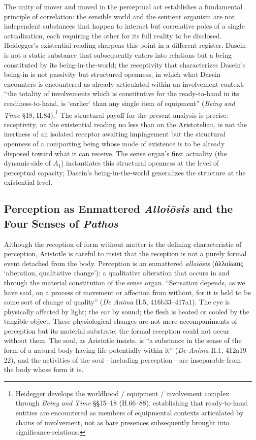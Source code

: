 \documentclass{article}
\newcommand{\gk}[1]{{\greekfont #1}}
\begin{document}
The unity of mover and moved in the perceptual act establishes a fundamental principle of correlation: the sensible world and the sentient organism are not independent substances that happen to interact but correlative poles of a single actualization, each requiring the other for its full reality to be disclosed. Heidegger's existential reading sharpens this point in a different register. Dasein is not a static substance that subsequently enters into relations but a being constituted by its being-in-the-world; the receptivity that characterizes Dasein's being-in is not passivity but structured openness, in which what Dasein encounters is encountered as already articulated within an involvement-context: ``the totality of involvements which is constitutive for the ready-to-hand in its readiness-to-hand, is `earlier' than any single item of equipment'' (\textit{Being and Time} \S 18, H.84).\footnote{Heidegger develops the worldhood / equipment / involvement complex through \textit{Being and Time} \S\S 15--18 (H.66--88), establishing that ready-to-hand entities are encountered as members of equipmental contexts articulated by chains of involvement, not as bare presences subsequently brought into significance-relations.} The structural payoff for the present analysis is precise: receptivity, on the existential reading no less than on the Aristotelian, is not the inertness of an isolated receptor awaiting impingement but the structural openness of a comporting being whose mode of existence is to be already disposed toward what it can receive. The sense organ's first actuality (the dynamis-side of $A_1$) instantiates this structural openness at the level of perceptual capacity; Dasein's being-in-the-world generalizes the structure at the existential level.

\subsection{Perception as Enmattered \textit{Alloiōsis} and the Four Senses of \textit{Pathos}}

Although the reception of form without matter is the defining characteristic of perception, Aristotle is careful to insist that the reception is not a purely formal event detached from the body. Perception is an enmattered \textit{alloiōsis} (\gk{ἀλλοίωσις} `alteration, qualitative change'): a qualitative alteration that occurs in and through the material constitution of the sense organ. ``Sensation depends, as we have said, on a process of movement or affection from without, for it is held to be some sort of change of quality'' (\textit{De Anima} II.5, 416b33--417a1). The eye is physically affected by light; the ear by sound; the flesh is heated or cooled by the tangible object. These physiological changes are not mere accompaniments of perception but its material substrate; the formal reception could not occur without them. The soul, as Aristotle insists, is ``a substance in the sense of the form of a natural body having life potentially within it'' (\textit{De Anima} II.1, 412a19--22), and the activities of the soul---including perception---are inseparable from the body whose form it is.
\end{document}

